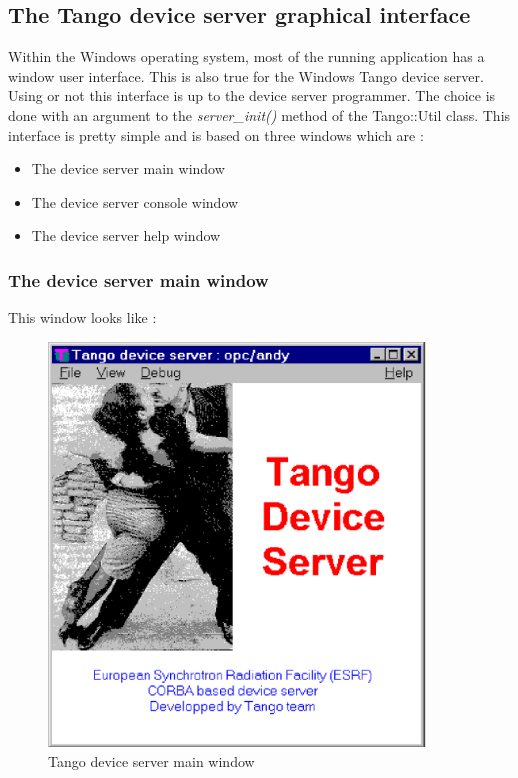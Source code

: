 \subsection{The Tango device server graphical interface}

Within the Windows operating system, most of the running application
has a window user interface. This is also true for the Windows Tango
device server. Using or not this interface is up to the device server
programmer. The choice is done with an argument to the \emph{server\_init()}
method of the Tango::Util class. This interface is pretty
simple and is based on three windows which are :
\begin{itemize}
\item The device server main window
\item The device server console window
\item The device server help window
\end{itemize}

\subsubsection{The device server main window}

This window looks like :

\vspace{0.3cm}

\begin{center}
\begin{figure}
\caption{Tango device server main window}

\includegraphics[width=10cm]{ds_writing/nt_server/main}
\end{figure}
\par\end{center}

